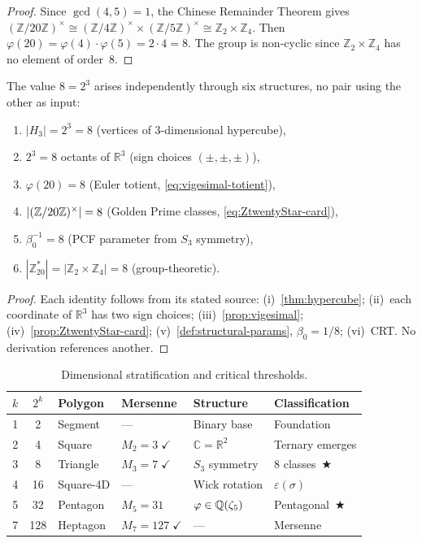 \begin{proof}
Since $\gcd(4,5)=1$, the Chinese Remainder Theorem gives
$(\mathbb{Z}/20\mathbb{Z})^\times\cong
(\mathbb{Z}/4\mathbb{Z})^\times\times(\mathbb{Z}/5\mathbb{Z})^\times
\cong\mathbb{Z}_2\times\mathbb{Z}_4$.
Then $\varphi(20)=\varphi(4)\cdot\varphi(5)=2\cdot 4=8$.  The group is
non-cyclic since $\mathbb{Z}_2\times\mathbb{Z}_4$ has no element of
order~$8$.
\end{proof}

\begin{Proposition}[Sextuple convergence of $8 = 2^3$]%
  \label{prop:sextuple-8}
The value $8 = 2^3$ arises independently through six structures, no pair
using the other as input:
\begin{enumerate}[label=(\roman*)]
  \item $|H_3| = 2^3 = 8$ (vertices of 3-dimensional hypercube),
  \item $2^3 = 8$ octants of $\mathbb{R}^3$ (sign choices $(\pm,\pm,\pm)$),
  \item $\varphi(20) = 8$ (Euler totient, \cref{eq:vigesimal-totient}),
  \item $|(\mathbb{Z}/20\mathbb{Z})^\times| = 8$ (Golden Prime classes, \cref{eq:ZtwentyStar-card}),
  \item $\beta_0^{-1} = 8$ (PCF parameter from $S_3$ symmetry),
  \item $|\mathbb{Z}^*_{20}| = |\mathbb{Z}_2\times\mathbb{Z}_4| = 8$
    (group-theoretic).
\end{enumerate}
\end{Proposition}

\begin{proof}
Each identity follows from its stated source:
(i)~\cref{thm:hypercube};
(ii)~each coordinate of $\mathbb{R}^3$ has two sign choices;
(iii)~\cref{prop:vigesimal};
(iv)~\cref{prop:ZtwentyStar-card};
(v)~\cref{def:structural-params}, $\beta_0=1/8$;
(vi)~CRT.  No derivation references another.
\end{proof}

\begin{table}[ht]
\centering
\caption{Dimensional stratification and critical thresholds.}
\label{tab:dimensional-strat}
\begin{tabular}{ccllll}
\toprule
$k$ & $2^k$ & Polygon & Mersenne & Structure & Classification \\
\midrule
1 & 2   & Segment  & ---        & Binary base & Foundation \\
2 & 4   & Square   & $M_2=3\;\checkmark$ & $\mathbb{C}=\mathbb{R}^2$ & Ternary emerges \\
3 & 8   & Triangle & $M_3=7\;\checkmark$ & $S_3$ symmetry & 8 classes~$\bigstar$ \\
4 & 16  & Square-4D & ---       & Wick rotation & $\varepsilon(\sigma)$ \\
5 & 32  & Pentagon  & $M_5=31$ & $\varphi \in \mathbb{Q}(\zeta_5)$ & Pentagonal~$\bigstar$ \\
7 & 128 & Heptagon & $M_7=127\;\checkmark$ & --- & Mersenne \\
\bottomrule
\end{tabular}
\end{table}

